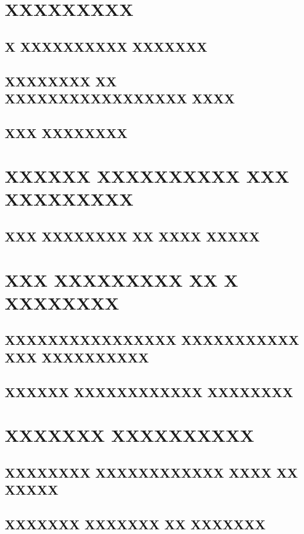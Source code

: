 \documentclass{acmart}
\begin{document}
\title{}
\begin{abstract}
\end{abstract}
\maketitle
\section{XXXXXXXXX}
\subsection{X XXXXXXXXXX XXXXXXX}
\subsection{XXXXXXXX XX XXXXXXXXXXXXXXXXX XXXX}
\subsection{XXX XXXXXXXX}
\section{XXXXXX XXXXXXXXXX XXX XXXXXXXXX}
\subsection{XXX XXXXXXXX XX XXXX XXXXX}
\section{XXX XXXXXXXXX XX X XXXXXXXX}
\subsection{XXXXXXXXXXXXXXXX XXXXXXXXXXX XXX XXXXXXXXXX}
\subsection{XXXXXX XXXXXXXXXXXX XXXXXXXX}
\section{XXXXXXX XXXXXXXXXX}
\subsection{XXXXXXXX XXXXXXXXXXXX XXXX XX XXXXX}
\subsection{XXXXXXX XXXXXXX XX XXXXXXX}
\end{document}
